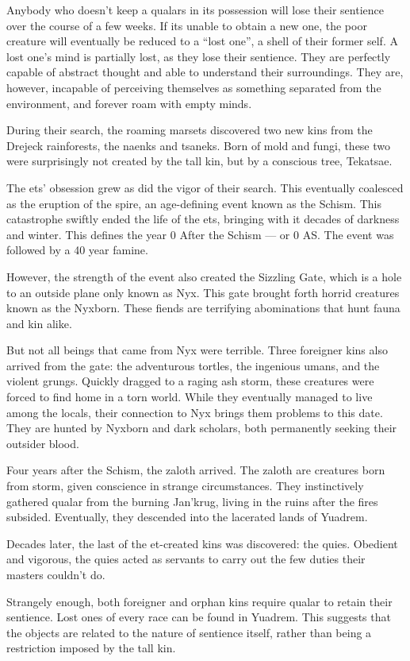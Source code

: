 Anybody who doesn't keep a qualars in its possession will lose their sentience over the course of a few weeks.
If its unable to obtain a new one, the poor creature will eventually be reduced to a ``lost one'', a shell of their former self.
A lost one's mind is partially lost, as they lose their sentience.
They are perfectly capable of abstract thought and able to understand their surroundings.
They are, however, incapable of perceiving themselves as something separated from the environment, and forever roam with empty minds.

During their search, the roaming marsets discovered two new kins from the Drejeck rainforests, the naenks and tsaneks.
Born of mold and fungi, these two were surprisingly not created by the tall kin, but by a conscious tree, Tekatsae.

The ets' obsession grew as did the vigor of their search.
This eventually coalesced as the eruption of the spire, an age-defining event known as the Schism.
This catastrophe swiftly ended the life of the ets, bringing with it decades of darkness and winter.
This defines the year 0 After the Schism --- or 0 AS.
The event was followed by a 40 year famine.

However, the strength of the event also created the Sizzling Gate, which is a hole to an outside plane only known as Nyx.
This gate brought forth horrid creatures known as the Nyxborn.
These fiends are terrifying abominations that hunt fauna and kin alike.

But not all beings that came from Nyx were terrible.
Three foreigner kins also arrived from the gate: the adventurous tortles, the ingenious umans, and the violent grungs.
Quickly dragged to a raging ash storm, these creatures were forced to find home in a torn world.
While they eventually managed to live among the locals, their connection to Nyx brings them problems to this date.
They are hunted by Nyxborn and dark scholars, both permanently seeking their outsider blood.

Four years after the Schism, the zaloth arrived.
The zaloth are creatures born from storm, given conscience in strange circumstances.
They instinctively gathered qualar from the burning Jan'krug, living in the ruins after the fires subsided.
Eventually, they descended into the lacerated lands of Yuadrem.

Decades later, the last of the et-created kins was discovered: the quies.
Obedient and vigorous, the quies acted as servants to carry out the few duties their masters couldn't do.

Strangely enough, both foreigner and orphan kins require qualar to retain their sentience.
Lost ones of every race can be found in Yuadrem.
This suggests that the objects are related to the nature of sentience itself, rather than being a restriction imposed by the tall kin.







